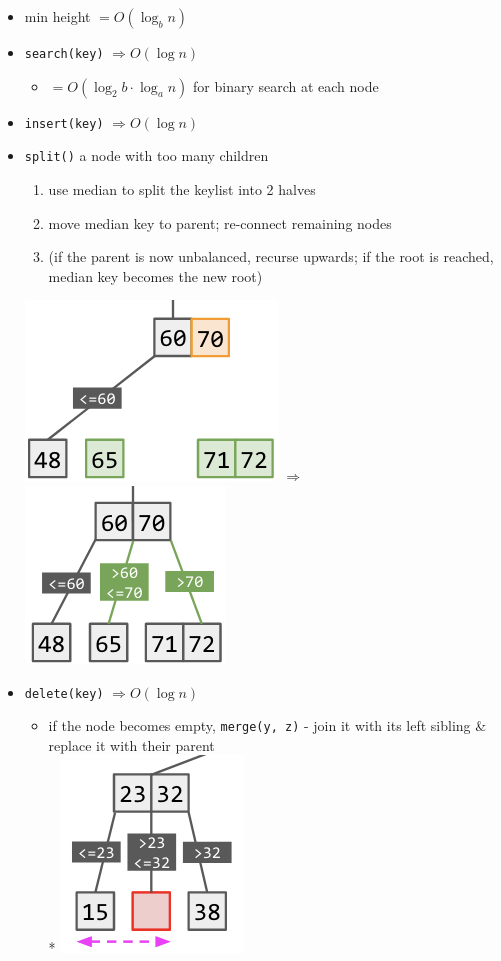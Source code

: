 \documentclass[10pt, landscape]{article}
\let\Then\Rightarrow
\newcommand{\code}[1]{\textcolor{mygreen}{\texttt{#1}}}
\begin{document}
\begin{multicols}{3}
\begin{itemize}
    \item min height $= O(\log_bn)$
    \item \code{search(key)} $\Then O(\log n)$
    \begin{itemize}
        \item $= O(\log_2 b \cdot \log_a n)$ for binary search at each node
    \end{itemize}
    \item \code{insert(key)} $\Then O(\log n)$
    \item \code{split()} a node with too many children
    \begin{enumerate}
        \item use median to split the keylist into 2 halves
        \item move median key to parent; re-connect remaining nodes
        \item (if the parent is now unbalanced, recurse upwards; if the root is reached, median key becomes the new root)
    \end{enumerate}
    \includegraphics[width=0.4\linewidth]{cs2040s-abtree-split-1.png}
    $\Then$
    \includegraphics[width=0.3\linewidth]{cs2040s-abtree-split-2.png}
    \item \code{delete(key)} $\Then O(\log n)$
    \begin{itemize}
        \item if the node becomes empty, \code{merge(y, z)} - join it with its left sibling \& replace it with their parent
        \\* \includegraphics[width=0.25\linewidth]{cs2040s-abtree-delete-1.png}

\end{itemize}
\end{itemize}
\end{multicols}
\end{document}
